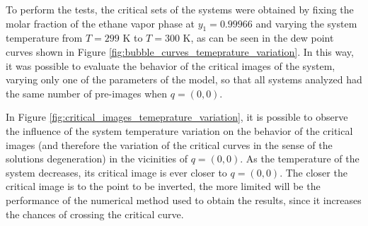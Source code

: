 \documentclass[journal=iecred,manuscript=article]{achemso}
\theoremstyle{definition}
\theoremstyle{remark}
\begin{document}
To perform the tests, the critical sets of the systems were obtained by fixing the molar fraction of the ethane vapor phase at $ y_{1} = 0.99966 $ and varying the system temperature from $ T = 299 $ K to $ T = 300 $ K, as can be seen in the dew point curves shown in Figure \ref{fig:bubble_curves_temeprature_variation}. In this way, it was possible to evaluate the behavior of the critical images of the system, varying only one of the parameters of the model, so that all systems analyzed had the same number of pre-images when $ q = \left(0,0\right) $.

In Figure \ref{fig:critical_images_temeprature_variation}, it is possible to observe the influence of the system temperature variation on the behavior of the critical images (and therefore the variation of the critical curves in the sense of the solutions degeneration) in the vicinities of $ q = \left(0, 0\right) $. As the temperature of the system decreases, its critical image is ever closer to $ q = \left(0, 0\right) $. The closer the critical image is to the point to be inverted, the more limited will be the performance of the numerical method used to obtain the results, since it increases the chances of crossing the critical curve.
\end{document}
